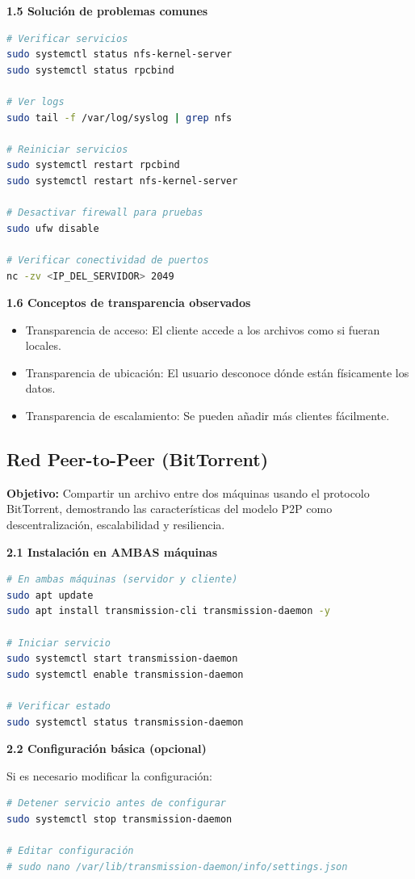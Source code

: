 \documentclass[12pt,a4paper]{report}
\begin{document}
\textbf{1.5 Solución de problemas comunes}
\begin{lstlisting}[language=bash]
# Verificar servicios
sudo systemctl status nfs-kernel-server
sudo systemctl status rpcbind

# Ver logs
sudo tail -f /var/log/syslog | grep nfs

# Reiniciar servicios
sudo systemctl restart rpcbind
sudo systemctl restart nfs-kernel-server

# Desactivar firewall para pruebas
sudo ufw disable

# Verificar conectividad de puertos
nc -zv <IP_DEL_SERVIDOR> 2049
\end{lstlisting}

\textbf{1.6 Conceptos de transparencia observados}
\begin{itemize}
    \item Transparencia de acceso: El cliente accede a los archivos como si fueran locales.
    \item Transparencia de ubicación: El usuario desconoce dónde están físicamente los datos.
    \item Transparencia de escalamiento: Se pueden añadir más clientes fácilmente.
\end{itemize}

\subsection{Red Peer-to-Peer (BitTorrent)}
\textbf{Objetivo:} Compartir un archivo entre dos máquinas usando el protocolo BitTorrent, demostrando las características del modelo P2P como descentralización, escalabilidad y resiliencia.

\textbf{2.1 Instalación en AMBAS máquinas}
\begin{lstlisting}[language=bash]
# En ambas máquinas (servidor y cliente)
sudo apt update
sudo apt install transmission-cli transmission-daemon -y

# Iniciar servicio
sudo systemctl start transmission-daemon
sudo systemctl enable transmission-daemon

# Verificar estado
sudo systemctl status transmission-daemon
\end{lstlisting}

\textbf{2.2 Configuración básica (opcional)}

Si es necesario modificar la configuración:
\begin{lstlisting}[language=bash]
# Detener servicio antes de configurar
sudo systemctl stop transmission-daemon

# Editar configuración
# sudo nano /var/lib/transmission-daemon/info/settings.json
\end{lstlisting}
\end{document}
